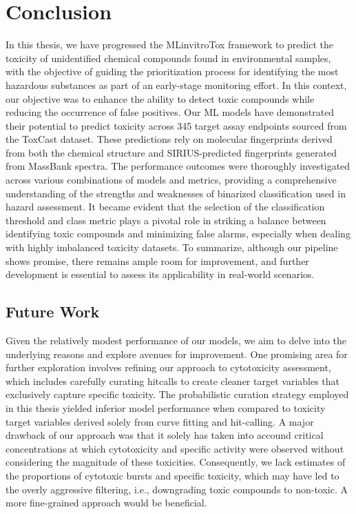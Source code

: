 \chapter{Conclusion}


In this thesis, we have progressed the MLinvitroTox framework to predict the toxicity of unidentified chemical compounds found in environmental samples, with the objective of guiding the prioritization process for identifying the most hazardous substances as part of an early-stage monitoring effort. In this context, our objective was to enhance the ability to detect toxic compounds while reducing the occurrence of false positives. Our ML models have demonstrated their potential to predict toxicity across 345 target assay endpoints sourced from the ToxCast dataset. These predictions rely on molecular fingerprints derived from both the chemical structure and SIRIUS-predicted fingerprints generated from MassBank spectra.
The performance outcomes were thoroughly investigated across various combinations of models and metrics, providing a comprehensive understanding of the strengths and weaknesses of binarized classification used in hazard assessment. It became evident that the selection of the classification threshold and class metric plays a pivotal role in striking a balance between identifying toxic compounds and minimizing false alarms, especially when dealing with highly imbalanced toxicity datasets.
To summarize, although our pipeline shows promise, there remains ample room for improvement, and further development is essential to assess its applicability in real-world scenarios.

\section{Future Work}
Given the relatively modest performance of our models, we aim to delve into the underlying reasons and explore avenues for improvement. One promising area for further exploration involves refining our approach to cytotoxicity assessment, which includes carefully curating hitcalls to create cleaner target variables that exclusively capture specific toxicity.
The probabilistic curation strategy employed in this thesis yielded inferior model performance when compared to toxicity target variables derived solely from curve fitting and hit-calling. A major drawback of our approach was that it solely has taken into accound critical concentrations at which cytotoxicity and specific activity were observed without considering the magnitude of these toxicities. Consequently, we lack estimates of the proportions of cytotoxic bursts and specific toxicity, which may have led to the overly aggressive filtering, i.e., downgrading toxic compounds to non-toxic. A more fine-grained approach would be beneficial.

